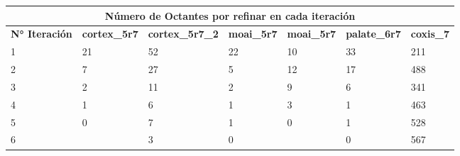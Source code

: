 \begin{table}[!ht]
\begin{tabular}{|lllllll|}
\hline
\multicolumn{7}{|c|}{Número de Octantes por refinar en cada iteración}                                                                                                                                                                                                                     \\ \hline
\multicolumn{1}{|l|}{\textbf{N° Iteración}} & \multicolumn{1}{l|}{\textbf{cortex\_5r7}} & \multicolumn{1}{l|}{\textbf{cortex\_5r7\_2}} & \multicolumn{1}{l|}{\textbf{moai\_5r7}} & \multicolumn{1}{l|}{\textbf{moai\_5r7}} & \multicolumn{1}{l|}{\textbf{palate\_6r7}} & \textbf{coxis\_7} \\ \hline
\multicolumn{1}{|l|}{1}                     & \multicolumn{1}{l|}{21}                   & \multicolumn{1}{l|}{52}                      & \multicolumn{1}{l|}{22}                 & \multicolumn{1}{l|}{10}                 & \multicolumn{1}{l|}{33}                   & 211               \\ \hline
\multicolumn{1}{|l|}{2}                     & \multicolumn{1}{l|}{7}                    & \multicolumn{1}{l|}{27}                      & \multicolumn{1}{l|}{5}                  & \multicolumn{1}{l|}{12}                 & \multicolumn{1}{l|}{17}                   & 488               \\ \hline
\multicolumn{1}{|l|}{3}                     & \multicolumn{1}{l|}{2}                    & \multicolumn{1}{l|}{11}                      & \multicolumn{1}{l|}{2}                  & \multicolumn{1}{l|}{9}                  & \multicolumn{1}{l|}{6}                    & 341               \\ \hline
\multicolumn{1}{|l|}{4}                     & \multicolumn{1}{l|}{1}                    & \multicolumn{1}{l|}{6}                       & \multicolumn{1}{l|}{1}                  & \multicolumn{1}{l|}{3}                  & \multicolumn{1}{l|}{1}                    & 463               \\ \hline
\multicolumn{1}{|l|}{5}                     & \multicolumn{1}{l|}{0}                    & \multicolumn{1}{l|}{7}                       & \multicolumn{1}{l|}{1}                  & \multicolumn{1}{l|}{0}                  & \multicolumn{1}{l|}{1}                    & 528               \\ \hline
\multicolumn{1}{|l|}{6}                     & \multicolumn{1}{l|}{}                     & \multicolumn{1}{l|}{3}                       & \multicolumn{1}{l|}{0}                  & \multicolumn{1}{l|}{}                   & \multicolumn{1}{l|}{0}                    & 567               \\ \hline

\end{tabular}
\end{table}
